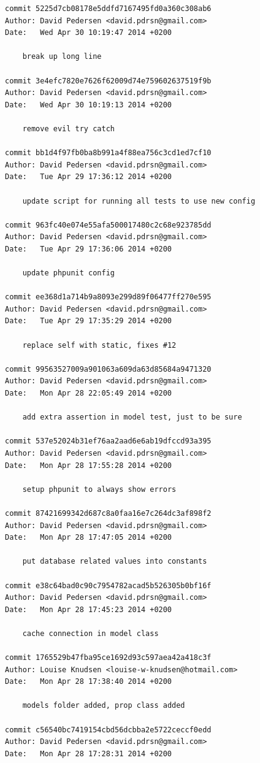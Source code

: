 \documentclass[12pt]{article}
\begin{document}
\begin{verbatim}
commit 5225d7cb08178e5ddfd7167495fd0a360c308ab6
Author: David Pedersen <david.pdrsn@gmail.com>
Date:   Wed Apr 30 10:19:47 2014 +0200

    break up long line

commit 3e4efc7820e7626f62009d74e759602637519f9b
Author: David Pedersen <david.pdrsn@gmail.com>
Date:   Wed Apr 30 10:19:13 2014 +0200

    remove evil try catch

commit bb1d4f97fb0ba8b991a4f88ea756c3cd1ed7cf10
Author: David Pedersen <david.pdrsn@gmail.com>
Date:   Tue Apr 29 17:36:12 2014 +0200

    update script for running all tests to use new config

commit 963fc40e074e55afa500017480c2c68e923785dd
Author: David Pedersen <david.pdrsn@gmail.com>
Date:   Tue Apr 29 17:36:06 2014 +0200

    update phpunit config

commit ee368d1a714b9a8093e299d89f06477ff270e595
Author: David Pedersen <david.pdrsn@gmail.com>
Date:   Tue Apr 29 17:35:29 2014 +0200

    replace self with static, fixes #12

commit 99563527009a901063a609da63d85684a9471320
Author: David Pedersen <david.pdrsn@gmail.com>
Date:   Mon Apr 28 22:05:49 2014 +0200

    add extra assertion in model test, just to be sure

commit 537e52024b31ef76aa2aad6e6ab19dfccd93a395
Author: David Pedersen <david.pdrsn@gmail.com>
Date:   Mon Apr 28 17:55:28 2014 +0200

    setup phpunit to always show errors

commit 87421699342d687c8a0faa16e7c264dc3af898f2
Author: David Pedersen <david.pdrsn@gmail.com>
Date:   Mon Apr 28 17:47:05 2014 +0200

    put database related values into constants

commit e38c64bad0c90c7954782acad5b526305b0bf16f
Author: David Pedersen <david.pdrsn@gmail.com>
Date:   Mon Apr 28 17:45:23 2014 +0200

    cache connection in model class

commit 1765529b47fba95ce1692d93c597aea42a418c3f
Author: Louise Knudsen <louise-w-knudsen@hotmail.com>
Date:   Mon Apr 28 17:38:40 2014 +0200

    models folder added, prop class added

commit c56540bc7419154cbd56dcbba2e5722ceccf0edd
Author: David Pedersen <david.pdrsn@gmail.com>
Date:   Mon Apr 28 17:28:31 2014 +0200


\end{verbatim}
\end{document}
